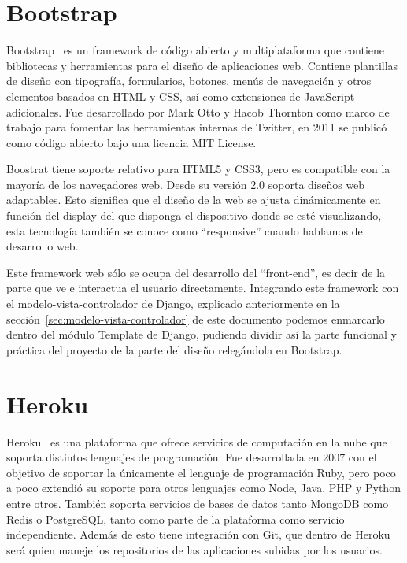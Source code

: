 \documentclass[a4paper, 12pt]{book}
\begin{document}
\section{Bootstrap}
\label{sec:bootstrap}
Bootstrap~\cite{bootstrap} es un framework de código abierto y multiplataforma que contiene bibliotecas y herramientas para el diseño de aplicaciones web. Contiene plantillas de diseño con tipografía, formularios, botones, menús de navegación y otros elementos basados en HTML y CSS, así como extensiones de JavaScript adicionales. Fue desarrollado por Mark Otto y Hacob Thornton como marco de trabajo para fomentar las herramientas internas de Twitter, en 2011 se publicó como código abierto bajo una licencia MIT License.

Boostrat tiene soporte relativo para HTML5 y CSS3, pero es compatible con la mayoría de los navegadores web. Desde su versión 2.0 soporta diseños web adaptables. Esto significa que el diseño de la web se ajusta dinámicamente en función del display del que disponga el dispositivo donde se esté visualizando, esta tecnología también se conoce como ``responsive'' cuando hablamos de desarrollo web.

Este framework web sólo se ocupa del desarrollo del ``front-end'', es decir de la parte que ve e interactua el usuario directamente. Integrando este framework con el modelo-vista-controlador de Django, explicado anteriormente en la sección~\ref{sec:modelo-vista-controlador} de este documento podemos enmarcarlo dentro del módulo Template de Django, pudiendo dividir así la parte funcional y práctica del proyecto de la parte del diseño relegándola en Bootstrap. 

\section{Heroku}
\label{sec:heroku}

Heroku~\cite{heroku} es una plataforma que ofrece servicios de computación en la nube que soporta distintos lenguajes de programación. Fue desarrollada en 2007 con el objetivo de soportar la únicamente el lenguaje de programación Ruby, pero poco a poco extendió su soporte para otros lenguajes como Node, Java, PHP y Python entre otros. También soporta servicios de bases de datos tanto MongoDB como Redis o PostgreSQL, tanto como parte de la plataforma como servicio independiente. Además de esto tiene integración con Git, que dentro de Heroku será quien maneje los repositorios de las aplicaciones subidas por los usuarios. 
\end{document}
